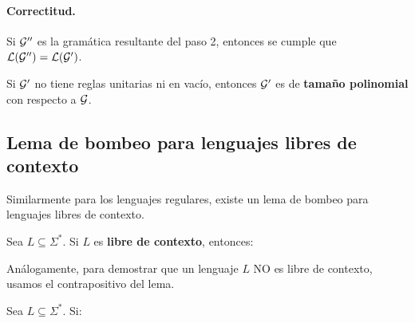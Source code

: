 \paragraph{Correctitud.} Si $\mathcal{G}''$ es la gramática resultante del paso 2, entonces se cumple que $\mathcal{L}(\mathcal{G}'') = \mathcal{L}(\mathcal{G}')$.


Si $\mathcal{G}'$ no tiene reglas unitarias ni en vacío, entonces $\mathcal{G}'$ es de \textbf{tamaño polinomial} con respecto a $\mathcal{G}$.

\subsection{Lema de bombeo para lenguajes libres de contexto}

Similarmente para los lenguajes regulares, existe un lema de bombeo para lenguajes libres de contexto. \bigbreak

Sea $L\subseteq \Sigma^*$. Si $L$ es \textbf{libre de contexto}, entonces:

Análogamente, para demostrar que un lenguaje $L$ NO es libre de contexto, usamos el contrapositivo del lema. \bigbreak

Sea $L \subseteq \Sigma^*$. Si:
